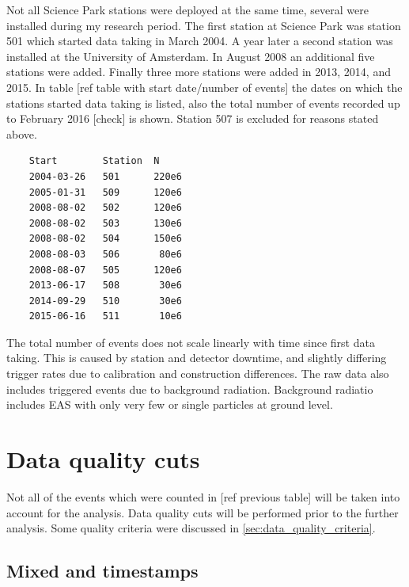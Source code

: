 Not all Science Park stations were deployed at the same time, several were installed during my research period. The first station at Science Park was station 501 which started data taking in March 2004. A year later a second station was installed at the University of Amsterdam. In August 2008 an additional five stations were added. Finally three more stations were added in 2013, 2014, and 2015. In table [ref table with start date/number of events] the dates on which the stations started data taking is listed, also the total number of events recorded up to February 2016 [check] is shown. Station 507 is excluded for reasons stated above.

\begin{verbatim}
    Start        Station  N
    2004-03-26   501      220e6
    2005-01-31   509      120e6
    2008-08-02   502      120e6
    2008-08-02   503      130e6
    2008-08-02   504      150e6
    2008-08-03   506       80e6
    2008-08-07   505      120e6
    2013-06-17   508       30e6
    2014-09-29   510       30e6
    2015-06-16   511       10e6
\end{verbatim}

The total number of events does not scale linearly with time since first data taking. This is caused by station and detector downtime, and slightly differing trigger rates due to calibration and construction differences. The raw data also includes triggered events due to background radiation. Background radiatio includes EAS with only very few or single particles at ground level.


\section{Data quality cuts}

Not all of the events which were counted in [ref previous table] will be taken into account for the analysis. Data quality cuts will be performed prior to the further analysis. Some quality criteria were discussed in \cref{sec:data_quality_criteria}.


\subsection{Mixed \utc and \gps timestamps}

